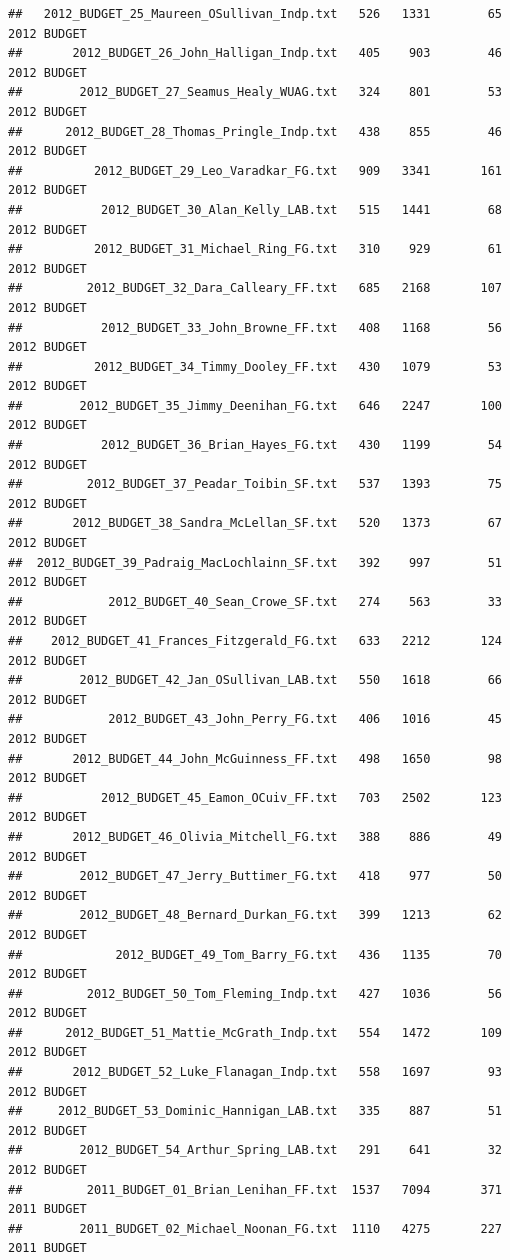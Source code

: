 \documentclass[11pt]{article}
\begin{document}
\begin{knitrout}
\begin{kframe}
\begin{verbatim}
##   2012_BUDGET_25_Maureen_OSullivan_Indp.txt   526   1331        65 2012 BUDGET
##       2012_BUDGET_26_John_Halligan_Indp.txt   405    903        46 2012 BUDGET
##        2012_BUDGET_27_Seamus_Healy_WUAG.txt   324    801        53 2012 BUDGET
##      2012_BUDGET_28_Thomas_Pringle_Indp.txt   438    855        46 2012 BUDGET
##          2012_BUDGET_29_Leo_Varadkar_FG.txt   909   3341       161 2012 BUDGET
##           2012_BUDGET_30_Alan_Kelly_LAB.txt   515   1441        68 2012 BUDGET
##          2012_BUDGET_31_Michael_Ring_FG.txt   310    929        61 2012 BUDGET
##         2012_BUDGET_32_Dara_Calleary_FF.txt   685   2168       107 2012 BUDGET
##           2012_BUDGET_33_John_Browne_FF.txt   408   1168        56 2012 BUDGET
##          2012_BUDGET_34_Timmy_Dooley_FF.txt   430   1079        53 2012 BUDGET
##        2012_BUDGET_35_Jimmy_Deenihan_FG.txt   646   2247       100 2012 BUDGET
##           2012_BUDGET_36_Brian_Hayes_FG.txt   430   1199        54 2012 BUDGET
##         2012_BUDGET_37_Peadar_Toibin_SF.txt   537   1393        75 2012 BUDGET
##       2012_BUDGET_38_Sandra_McLellan_SF.txt   520   1373        67 2012 BUDGET
##  2012_BUDGET_39_Padraig_MacLochlainn_SF.txt   392    997        51 2012 BUDGET
##            2012_BUDGET_40_Sean_Crowe_SF.txt   274    563        33 2012 BUDGET
##    2012_BUDGET_41_Frances_Fitzgerald_FG.txt   633   2212       124 2012 BUDGET
##        2012_BUDGET_42_Jan_OSullivan_LAB.txt   550   1618        66 2012 BUDGET
##            2012_BUDGET_43_John_Perry_FG.txt   406   1016        45 2012 BUDGET
##       2012_BUDGET_44_John_McGuinness_FF.txt   498   1650        98 2012 BUDGET
##           2012_BUDGET_45_Eamon_OCuiv_FF.txt   703   2502       123 2012 BUDGET
##       2012_BUDGET_46_Olivia_Mitchell_FG.txt   388    886        49 2012 BUDGET
##        2012_BUDGET_47_Jerry_Buttimer_FG.txt   418    977        50 2012 BUDGET
##        2012_BUDGET_48_Bernard_Durkan_FG.txt   399   1213        62 2012 BUDGET
##             2012_BUDGET_49_Tom_Barry_FG.txt   436   1135        70 2012 BUDGET
##         2012_BUDGET_50_Tom_Fleming_Indp.txt   427   1036        56 2012 BUDGET
##      2012_BUDGET_51_Mattie_McGrath_Indp.txt   554   1472       109 2012 BUDGET
##       2012_BUDGET_52_Luke_Flanagan_Indp.txt   558   1697        93 2012 BUDGET
##     2012_BUDGET_53_Dominic_Hannigan_LAB.txt   335    887        51 2012 BUDGET
##        2012_BUDGET_54_Arthur_Spring_LAB.txt   291    641        32 2012 BUDGET
##         2011_BUDGET_01_Brian_Lenihan_FF.txt  1537   7094       371 2011 BUDGET
##        2011_BUDGET_02_Michael_Noonan_FG.txt  1110   4275       227 2011 BUDGET

\end{verbatim}
\end{kframe}
\end{knitrout}
\end{document}
